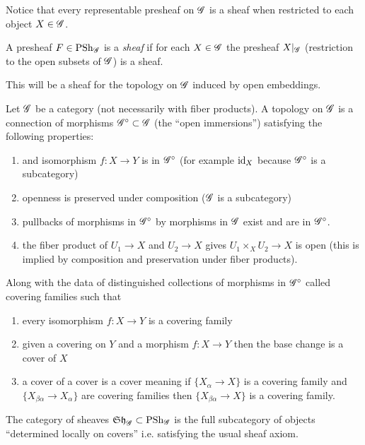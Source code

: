 \documentclass[12pt]{article}
\begin{document}
\begin{rmk}
Notice that every representable presheaf on $\mathscr{G}$ is a sheaf when restricted to each object $X \in \mathscr{G}$. 
\end{rmk}

\begin{defn}
A presheaf $F \in \mathrm{PSh}_{\mathscr{G}}$ is a \textit{sheaf} if for each $X \in \mathscr{G}$ the presheaf $X|_{\mathscr{G}}$ (restriction to the open subsets of $\mathscr{G}$) is a sheaf. 
\end{defn}

\begin{rmk}
This will be a sheaf for the topology on $\mathscr{G}$ induced by open embeddings. 
\end{rmk}

\begin{defn}
Let $\mathscr{G}$ be a category (not necessarily with fiber products). A topology on $\mathscr{G}$ is a connection of morphisms $\mathscr{G}^\circ \subset \mathscr{G}$ (the ``open immersions'') satisfying the following properties:
\begin{enumerate}
\item and isomorphism $f : X \to Y$ is in $\mathscr{G}^\circ$ (for example $\mathrm{id}_X$ because $\mathscr{G}^\circ$ is a subcategory)
\item openness is preserved under composition ($\mathscr{G}$ is a subcategory)
\item pullbacks of morphisms in $\mathscr{G}^\circ$ by morphisms in $\mathscr{G}$ exist and are in $\mathscr{G}^\circ$.
\item the fiber product of $U_1 \to X$ and $U_2 \to X$ gives $U_1 \times_X U_2 \to X$ is open (this is implied by composition and preservation under fiber products).
\end{enumerate}
Along with the data of distinguished collections of morphisms in $\mathscr{G}^\circ$ called covering families such that
\begin{enumerate}
\item every isomorphism $f : X \to Y$ is a covering family
\item given a covering on $Y$ and a morphism $f : X \to Y$ then the base change is a cover of $X$
\item a cover of a cover is a cover meaning if $\{ X_\alpha \to X \}$ is a covering family and $\{ X_{\beta \alpha} \to X_\alpha \}$ are covering families then $\{ X_{\beta \alpha} \to X \}$ is a covering family. 
\end{enumerate}
\end{defn}

\begin{defn}
The category of sheaves $\mathfrak{Sh}_{\mathscr{G}} \subset \mathrm{PSh}_{\mathscr{G}}$ is the full subcategory of objects ``determined locally on covers'' i.e. satisfying the usual sheaf axiom. 
\end{defn}
\end{document}
